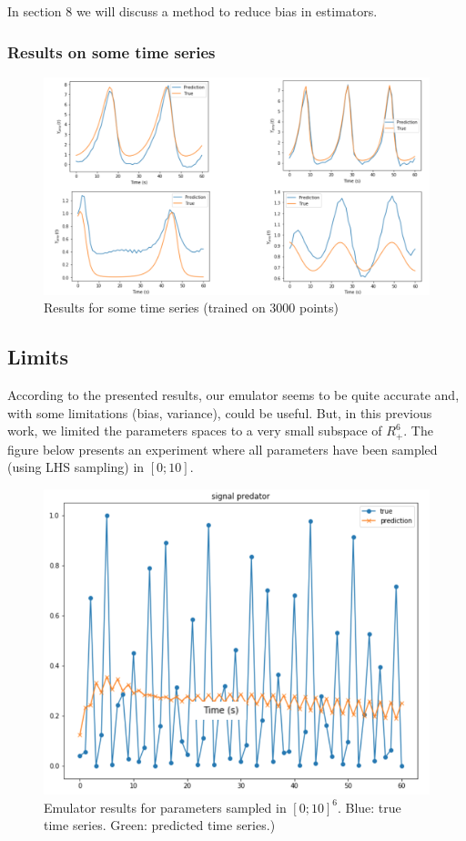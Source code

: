 \documentclass{article}
\begin{document}
In section 8 we will discuss a method to reduce bias in estimators. 

\subsubsection{Results on some time series}

\begin{figure}[H]
\centering
\includegraphics[scale=0.4]{image/some_time_series_signal.png}
\caption{Results for some time series (trained on 3000 points)}
\label{fig: some time series}
\end{figure}

\subsection{Limits}
According to the presented results, our emulator seems to be quite accurate and, with some limitations (bias, variance), could be useful.  But, in this previous work, we limited the parameters spaces to a very small subspace of $R_+^6$. The figure below presents an experiment where all parameters have been sampled (using LHS sampling) in $[0;10]$. 

\begin{figure}[H]
\centering
\includegraphics[scale=0.6]{image/limitation_time_series.png}
\caption{Emulator results for parameters sampled in $[0;10]^6$. Blue: true time series. Green: predicted time series.)}
\label{fig: some time series}
\end{figure}
\end{document}
